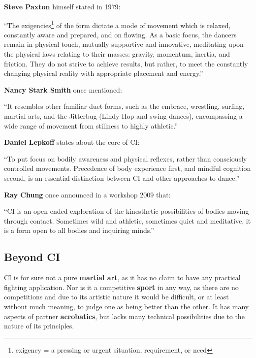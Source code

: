 \textbf{Steve Paxton} himself stated in 1979:
\begin{displayquote}
    ``The exigencies\footnote{exigency = a pressing or urgent situation, requirement, or need} of the form dictate a mode of movement which is relaxed, constantly aware and prepared, and on flowing.
    As a basic focus, the dancers remain in physical touch, mutually supportive and innovative, meditating upon the physical laws relating to their masses: gravity, momentum, inertia, and friction.
    They do not strive to achieve results, but rather, to meet the constantly changing physical reality with appropriate placement and energy.''
\end{displayquote}

\textbf{Nancy Stark Smith} once mentioned:
\begin{displayquote}
    ``It resembles other familiar duet forms, such as the embrace, wrestling, surfing, martial arts, and the Jitterbug (Lindy Hop and swing dances), encompassing a wide range of movement from stillness to highly athletic.''
\end{displayquote}

\textbf{Daniel Lepkoff} states about the core of CI:
\begin{displayquote}
    ``To put focus on bodily awareness and physical reflexes, rather than consciously controlled movements.
    Precedence of body experience first, and mindful cognition second, is an essential distinction between CI and other approaches to dance.''
\end{displayquote}

\textbf{Ray Chung} once announced in a workshop 2009 that:
\begin{displayquote}
    ``CI is an open-ended exploration of the kinesthetic possibilities of bodies moving through contact.
    Sometimes wild and athletic, sometimes quiet and meditative, it is a form open to all bodies and inquiring minds.''
\end{displayquote}

\subsection{Beyond CI}\label{sec:beyond-ci}

CI is for sure not a pure \textbf{martial art}, as it has no claim to have any practical fighting application.
Nor is it a competitive \textbf{sport} in any way, as there are no competitions and due to its artistic nature it would be difficult, or at least without much meaning, to judge one as being better than the other.
It has many aspects of partner \textbf{acrobatics}, but lacks many technical possibilities due to the nature of its principles.

